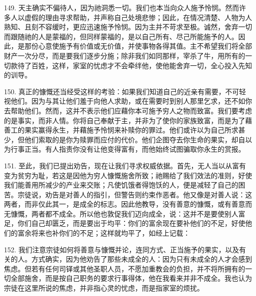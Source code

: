 149. 天主确实不偏待人，因为祂洞悉一切。我们也本当向众人施予怜悯。然而许多人以虚假的理由寻求帮助，并声称自己处境悲惨；因此，在情况清楚、人物为人熟知、且刻不容缓时，更应迅速施予怜悯。因为主并不苛求至极。诚然，舍弃一切而跟随祂的人是蒙福的，但同样蒙福的，是以自己所有、尽己所能施予的人。因此，是那份心意使施予有价值或无价值，并使事物各得其值。主不希望我们将全部财产一次分尽，而是要我们逐步分施；除非我们如同那样，宰杀了牛，用所有的一切款待了百姓，这样，家室的忧虑才不会牵绊他，使他能舍弃一切，全心投入先知的训导。\par

150. 真正的慷慨还当经受这样的考验：如果我们知道自己的近亲有需要，不可轻视他们。因为与其让他们羞于向他人求助，或在需要时到别人那里乞求，还不如你去帮助他们。然而，这并不表示他们应藉你本可施予穷人之物而致富。我们要考虑的是事实，而非人情。你将自己奉献于主，并非为了使你的家族致富，而是为了藉善工的果实赢得永生，并藉施予怜悯来补赎你的罪过。他们或许以为自己所求甚少，但他们索取的是你为赎罪而应付的代价。他们企图夺去你生命的果实，却自以为行事正当。有人指责你没有让他变得富有，而他始终试图骗取你永生的赏报。\par

151. 至此，我们已提出劝告，现在让我们寻求权威依据。首先，无人当以从富有变为贫穷为耻，若这是因他为穷人慷慨施舍所致；祂赐给了我们效法的准则，好使我们能善用所减少的产业来交账；凡使饥饿者得饱饫的人，便是减轻了自己的困苦。宗徒说，劝告是对善人的指引，但警告则约束作恶者。他又像是对善人说：这两者，而非仅此其一，是成全的标志。因此他教导，没有善意的慷慨，或有善意而无慷慨，两者都不成全。所以他也敦促我们迈向成全，说：这并不是要使别人富足，你们自己却匮乏，而是要出于均平：你们的富余现在要补他们的不足，好使他们的富余将来也补你们的不足；这样就均平了，如经上记载：\par

152. 我们注意宗徒如何将善意与慷慨并论，连同方式、正当施予的果实，以及有关的人。方式确实，因为他劝告了那些未成全的人：因为只有未成全的人才会感到焦虑。但若有任何司铎或其他圣职人员，不愿加重教会的负担，并不将所拥有的一切全部施舍，而是按自己职务的要求行事得体，他在我看来并非不成全。我也认为宗徒在这里所说的焦虑，并非指心灵的忧虑，而是指家室的烦扰。\par


